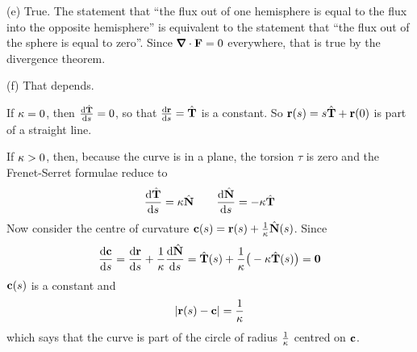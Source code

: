 \begin{solution}

\noindent (e) True. The statement that 
 ``the flux out of one hemisphere is equal 
   to the flux into the opposite hemisphere''
is equivalent to the statement that
  ``the flux out of the sphere is equal to zero''.
Since $\vnabla\cdot\vF=0$ everywhere, that is true by the divergence
theorem.

\noindent (f) That depends. 

If $\kappa=0$, then $\diff{\hat\vT}{s}=0$, so that $\diff{\vr}{s}=\hat\vT$
is a constant. So $\mathbf{r}(s) = s\hat{\mathbf{T}} +\mathbf{r}(0)$ is part of a straight line.

If $\kappa>0$, then, because the curve is in a plane, the torsion $\tau$ is
zero and the Frenet-Serret formulae reduce to
\begin{equation*}
\diff{\hat\vT}{s} = \ka\hat\vN\qquad
\diff{\hat\vN}{s} = -\ka\hat\vT
\end{equation*}
Now consider the centre of curvature $\mathbf{c}(s) = \mathbf{r}(s) +\frac{1}{\kappa}\hat{\mathbf{N}}(s)$.
Since 
\begin{equation*}
\diff{\vc}{s} = \diff{\vr}{s} +\frac{1}{\ka}\diff{\hat\vN}{s}
              =\hat\vT(s) +\frac{1}{\ka}\big(-\ka\hat\vT(s)\big)
              =\vZero
\end{equation*}
$\mathbf{c}(s)$ is a constant and
\begin{equation*}
|\mathbf{r}(s) -\mathbf{c}| =\frac{1}{\kappa}
\end{equation*}
which says that the curve is part of the circle of radius $\frac{1}{\kappa}$
centred on $\mathbf{c}$.


\end{solution}
